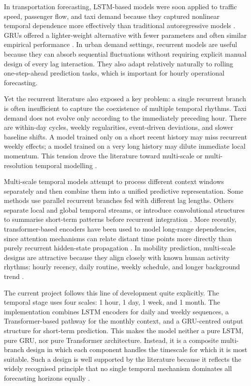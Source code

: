 \documentclass[12pt,a4paper]{report}
\begin{document}
In transportation forecasting, LSTM-based models were soon applied to traffic speed, passenger flow, and taxi demand because they captured nonlinear temporal dependence more effectively than traditional autoregressive models \cite{jiang2022survey,lstmtraffic2024survey}. GRUs offered a lighter-weight alternative with fewer parameters and often similar empirical performance \cite{chung2014gru}. In urban demand settings, recurrent models are useful because they can absorb sequential fluctuations without requiring explicit manual design of every lag interaction. They also adapt relatively naturally to rolling one-step-ahead prediction tasks, which is important for hourly operational forecasting.

Yet the recurrent literature also exposed a key problem: a single recurrent branch is often insufficient to capture the coexistence of multiple temporal rhythms. Taxi demand does not evolve only according to the immediately preceding hour. There are within-day cycles, weekly regularities, event-driven deviations, and slower baseline shifts. A model trained only on a short recent history may miss recurrent weekly effects; a model trained on a very long history may dilute immediate local momentum. This tension drove the literature toward multi-scale or multi-resolution temporal modelling \cite{liao2022taxi,effective2021multiresolution}.

Multi-scale temporal models attempt to process different context windows separately and then combine them into a unified predictive representation. Some methods use parallel recurrent branches fed with different lag lengths. Others separate local and global temporal streams, or introduce convolutional structures to summarise short-term patterns before recurrent integration \cite{effective2021multiresolution,kim2025dltimeseries}. More recently, transformer-based encoders have been used to model long-range dependencies, since attention mechanisms can relate distant time points more directly than purely recurrent hidden-state propagation \cite{zhao2026transformers,kim2025dltimeseries}. In mobility prediction, multi-scale designs are attractive because they align closely with known human activity rhythms: hourly recency, daily routine, weekly schedule, and longer background trend \cite{liao2022taxi,tang2019spatiotemporal}.

The current project follows this line of development quite explicitly. The temporal stage uses four scales: 1 hour, 1 day, 1 week, and 1 month. The implementation combines LSTM encoders for daily and weekly sequences, a Transformer-based pathway for the monthly context, and a GRU-centred output structure for short-term prediction. This makes the model neither a pure LSTM, pure GRU, nor pure Transformer architecture. Instead, it is a composite multi-branch design in which each component handles the timescale for which it is most suitable. Such a design is well supported by the literature because it reflects the widely recognised principle that no single temporal mechanism dominates all forecasting horizons equally \cite{kim2025dltimeseries,zhao2026transformers}.
\end{document}
